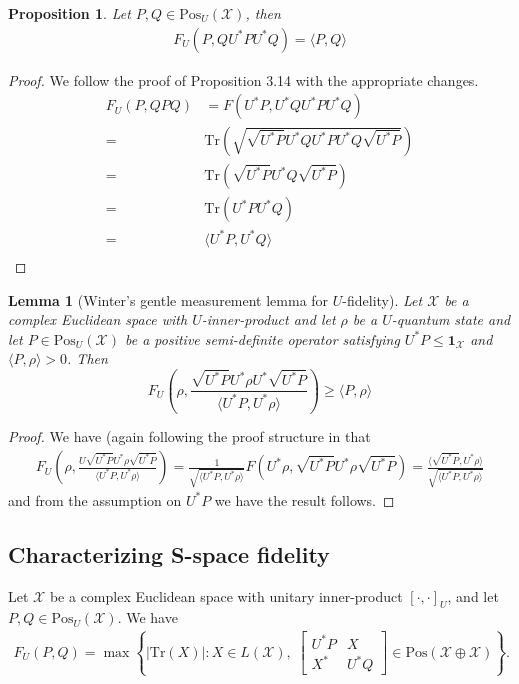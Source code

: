 \documentclass{amsart}
\numberwithin{equation}{section}
\newtheorem{lemma}[theorem]{Lemma}
\newtheorem{proposition}[theorem]{Proposition}
\theoremstyle{definition}
\theoremstyle{plain}
\theoremstyle{solutionstyle}
\begin{document}
\begin{proposition}
    Let $P,Q \in\mathrm{Pos}_U(\mathcal{X})$, then 
    \begin{align*}
        F_U(P,QU^*PU^*Q)=\langle P,Q \rangle
    \end{align*}
\end{proposition}
 \begin{proof}We follow the proof of Proposition 3.14 \cite{Watrous_2018} with the appropriate changes.
     \begin{align*}
     F_U(P,QPQ)&=F(U^*P,U^*QU^*PU^*Q)\\
     =&\mathrm{Tr}(\sqrt{\sqrt{U^*P}U^*QU^*PU^*Q\sqrt{U^*P}})\\
     =&\mathrm{Tr}(\sqrt{U^*P}U^*Q\sqrt{U^*P})\\
     =&\mathrm{Tr}(U^*PU^*Q)\\
     =&\langle U^*P, U^*Q\rangle\\
     \end{align*}
 \end{proof}
\begin{lemma}[Winter's gentle measurement lemma for $U$-fidelity]
Let $\mathcal{X}$ be a complex Euclidean space with $U$-inner-product and let $\rho$ be a $U$-quantum state and let $P\in \mathrm{Pos}_U(\mathcal{X})$ be a positive semi-definite operator satisfying $U^*P\leq \mathbf{1}_{\mathcal{X}}$ and $\langle P,\rho\rangle>0$. Then
\begin{equation*}F_U\left(\rho, \frac{\sqrt{U^*P}U^*\rho U^*\sqrt{U^*P}}{\langle U^*P, U^*\rho\rangle}\right)\geq \langle P,\rho\rangle\end{equation*}
\end{lemma}
\begin{proof}
    We have (again following the proof structure in \cite[p.~143]{Watrous_2018} that
    \begin{align*}
        F_U\left(\rho,\frac{U\sqrt{U^*P}U^*\rho \sqrt{U^*P}}{\langle U^*P,U^*\rho\rangle}\right)=\frac{1}{\sqrt{\langle U^*P,U^*\rho\rangle}}F(U^*\rho, \sqrt{U^*P}U^*\rho \sqrt{U^*P})=\frac{\langle \sqrt{U^*P},U^*\rho\rangle}{\sqrt{\langle U^*P, U^*\rho\rangle}}
    \end{align*}
    and from the assumption on $U^*P$ we have the result follows. 
\end{proof}

\subsection{Characterizing S-space fidelity}
Let $\mathcal{X}$ be a complex Euclidean space with unitary inner-product $[\cdot,\cdot]_U$, and let $P, Q \in \mathrm{Pos}_U(\mathcal{X})$. We have
\begin{align*}
    F_U(P,Q)
    = \max \left\{ \left| \mathrm{Tr}(X) \right| : X \in L(\mathcal{X}), \;
    \begin{bmatrix}
        U^*P & X \\
        X^{*} & U^*Q
    \end{bmatrix}
     \in \mathrm{Pos}(\mathcal{X}\oplus\mathcal{X})
    \right\}.
\end{align*}
\end{document}
